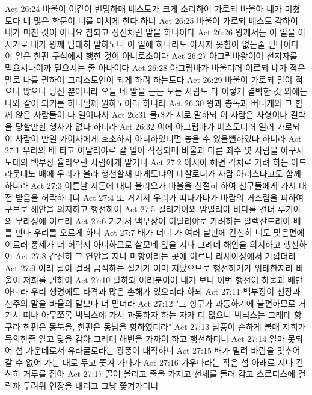 Act 26:24  바울이 이같이 변명하매 베스도가 크게 소리하여 가로되 바울아 네가 미쳤도다 네 많은 학문이 너를 미치게 한다 하니
Act 26:25  바울이 가로되 베스도 각하여 내가 미친 것이 아니요 참되고 정신차린 말을 하나이다
Act 26:26  왕께서는 이 일을 아시기로 내가 왕께 담대히 말하노니 이 일에 하나라도 아시지 못함이 없는줄 믿나이다 이 일은 한편 구석에서 행한 것이 아니로소이다
Act 26:27  아그립바왕이여 선지자를 믿으시나이까 믿으시는 줄 아나이다
Act 26:28  아그립바가 바울더러 이르되 네가 적은 말로 나를 권하여 그리스도인이 되게 하려 하는도다
Act 26:29  바울이 가로되 말이 적으나 많으나 당신 뿐아니라 오늘 네 말을 듣는 모든 사람도 다 이렇게 결박한 것 외에는 나와 같이 되기를 하나님께 원하노이다 하니라
Act 26:30  왕과 총독과 버니게와 그 함께 앉은 사람들이 다 일어나서
Act 26:31  물러가 서로 말하되 이 사람은 사형이나 결박을 당할만한 행사가 없다 하더라
Act 26:32  이에 아그립바가 베스도더러 일러 가로되 이 사람이 만일 가이사에게 호소하지 아니하였더면 놓을 수 있을뻔하였다 하니라
Act 27:1  우리의 배 타고 이달리야로 갈 일이 작정되매 바울과 다른 죄수 몇 사람을 아구사도대의 백부장 율리오란 사람에게 맡기니
Act 27:2  아시아 해변 각처로 가려 하는 아드라뭇데노 배에 우리가 올라 행선할새 마게도냐의 데살로니가 사람 아리스다고도 함께 하니라
Act 27:3  이튿날 시돈에 대니 율리오가 바울을 친절히 하여 친구들에게 가서 대접 받음을 허락하더니
Act 27:4  또 거기서 우리가 떠나가다가 바람의 거스림을 피하여 구브로 해안을 의지하고 행선하여
Act 27:5  길리기아와 밤빌리아 바다를 건너 루기아의 무라성에 이르러
Act 27:6  거기서 백부장이 이달리야로 가려하는 알렉산드리아 배를 만나 우리를 오르게 하니
Act 27:7  배가 더디 가 여러 날만에 간신히 니도 맞은편에 이르러 풍세가 더 허락지 아니하므로 살모네 앞을 지나 그레데 해안을 의지하고 행선하여
Act 27:8  간신히 그 연안을 지나 미항이라는 곳에 이르니 라새아성에서 가깝더라
Act 27:9  여러 날이 걸려 금식하는 절기가 이미 지났으므로 행선하기가 위태한지라 바울이 저희를 권하여
Act 27:10  말하되 여러분이여 내가 보니 이번 행선이 하물과 배만 아니라 우리 생명에도 타격과 많은 손해가 있으리라 하되
Act 27:11  백부장이 선장과 선주의 말을 바울의 말보다 더 믿더라
Act 27:12  "그 항구가 과동하기에 불편하므로 거기서 떠나 아무쪼록 뵈닉스에 가서 과동하자 하는 자가 더 많으니 뵈닉스는 그레데 항구라 한편은 동북을, 한편은 동남을 향하였더라"
Act 27:13  남풍이 순하게 불매 저희가 득의한줄 알고 닻을 감아 그레데 해변을 가까이 하고 행선하더니
Act 27:14  얼마 못되어 섬 가운데로서 유라굴로라는 광풍이 대작하니
Act 27:15  배가 밀려 바람을 맞추어 갈 수 없어 가는 대로 두고 쫓겨 가다가
Act 27:16  가우다라는 작은 섬 아래로 지나 간신히 거루를 잡아
Act 27:17  끌어 올리고 줄을 가지고 선체를 둘러 감고 스르디스에 걸릴까 두려워 연장을 내리고 그냥 쫓겨가더니
